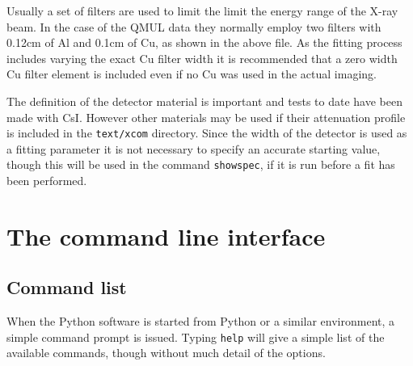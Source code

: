 \documentclass[a4paper]{article}
\begin{document}
Usually a set of filters are used to limit the limit the energy range of the X-ray beam. In the case of the QMUL data they
normally employ two filters with 0.12cm of Al and 0.1cm of Cu, as shown in the above file.
As the fitting process includes varying the exact Cu filter width it is recommended that a zero width Cu filter element is included
even if no Cu was used in the actual imaging.

The definition of the detector material is important and tests to date have been made with CsI. However other materials may be used
if their attenuation profile is included in the \texttt{text/xcom} directory.
Since the width of the detector is used as a fitting parameter it is not necessary to specify an accurate starting value, though this
will be used in the command \texttt{showspec}, if it is run before a fit has been performed.

\section{The command line interface}

\subsection{Command list}

When the Python software is started from Python or a similar environment, a simple command prompt is issued.
Typing \texttt{help} will give a simple list of the available commands, though without much detail of the options.
\end{document}
